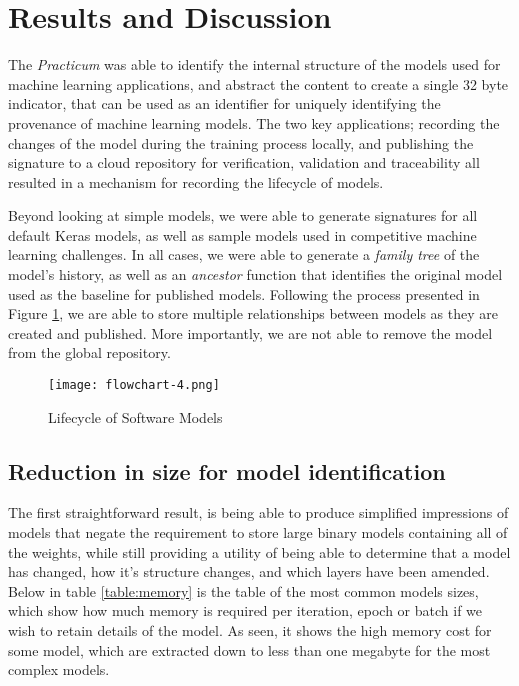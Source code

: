 \section{Results and Discussion}

The \textit{Practicum} was able to identify the internal structure of the models used for machine learning applications, and abstract the content to create a single 32 byte indicator, that can be used as an identifier for uniquely identifying the provenance of machine learning models. The two key applications; recording the changes of the model during the training process locally, and publishing the signature to a cloud repository for verification, validation and traceability all resulted in a mechanism for recording the lifecycle of models.

Beyond looking at simple models, we were able to generate signatures for all default Keras models, as well as sample models used in competitive machine learning challenges. In all cases, we were able to generate a \textit{family tree} of the model's history, as well as an \textit{ancestor} function that identifies the original model used as the baseline for published models. Following the process presented in Figure \ref{fig:lifecycleModels}, we are able to store multiple relationships between models as they are created and published. More importantly, we are not able to remove the model from the global repository.

\begin{figure}[!t]
    \centering
    \texttt{[image: flowchart-4.png]}
    \caption{Lifecycle of Software Models}
    \label{fig:lifecycleModels}
\end{figure}

\subsection{Reduction in size for model identification}
The first straightforward result, is being able to produce simplified impressions of models that negate the requirement to store large binary models containing all of the weights, while still providing a utility of being able to determine that a model has changed, how it's structure changes, and which layers have been amended. Below in table \ref{table:memory} is the table of the most common models sizes, which show how much memory is required per iteration, epoch or batch if we wish to retain details of the model. As seen, it shows the high memory cost for some model, which are extracted down to less than one megabyte for the most complex models.

